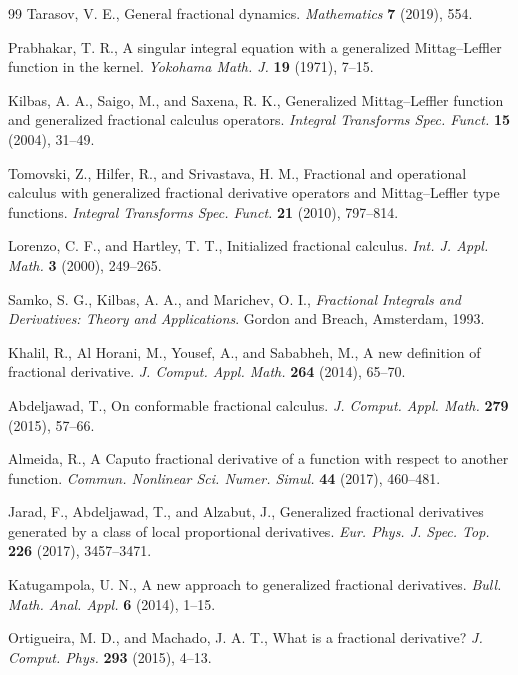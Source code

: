 \documentclass[11pt]{article}
\numberwithin{equation}{section}
\begin{document}
{\begin{thebibliography}{99}
Tarasov, V. E.,
General fractional dynamics.
\textit{Mathematics}
\textbf{7} (2019), 554.

Prabhakar, T. R.,
A singular integral equation with a generalized Mittag--Leffler function in the kernel.
\textit{Yokohama Math. J.}
\textbf{19} (1971), 7--15.

Kilbas, A. A., Saigo, M., and Saxena, R. K.,
Generalized Mittag--Leffler function and generalized fractional calculus operators.
\textit{Integral Transforms Spec. Funct.}
\textbf{15} (2004), 31--49.

Tomovski, Z., Hilfer, R., and Srivastava, H. M.,
Fractional and operational calculus with generalized fractional derivative operators and Mittag--Leffler type functions.
\textit{Integral Transforms Spec. Funct.}
\textbf{21} (2010), 797--814.

Lorenzo, C. F., and Hartley, T. T.,
Initialized fractional calculus.
\textit{Int. J. Appl. Math.}
\textbf{3} (2000), 249--265.

Samko, S. G., Kilbas, A. A., and Marichev, O. I.,
\textit{Fractional Integrals and Derivatives: Theory and Applications}.
Gordon and Breach, Amsterdam, 1993.

Khalil, R., Al Horani, M., Yousef, A., and Sababheh, M.,
A new definition of fractional derivative.
\textit{J. Comput. Appl. Math.}
\textbf{264} (2014), 65--70.

Abdeljawad, T.,
On conformable fractional calculus.
\textit{J. Comput. Appl. Math.}
\textbf{279} (2015), 57--66.

Almeida, R.,
A Caputo fractional derivative of a function with respect to another function.
\textit{Commun. Nonlinear Sci. Numer. Simul.}
\textbf{44} (2017), 460--481.

Jarad, F., Abdeljawad, T., and Alzabut, J.,
Generalized fractional derivatives generated by a class of local proportional derivatives.
\textit{Eur. Phys. J. Spec. Top.}
\textbf{226} (2017), 3457--3471.

Katugampola, U. N.,
A new approach to generalized fractional derivatives.
\textit{Bull. Math. Anal. Appl.}
\textbf{6} (2014), 1--15.

Ortigueira, M. D., and Machado, J. A. T.,
What is a fractional derivative?
\textit{J. Comput. Phys.}
\textbf{293} (2015), 4--13.


\end{thebibliography}}
\end{document}
